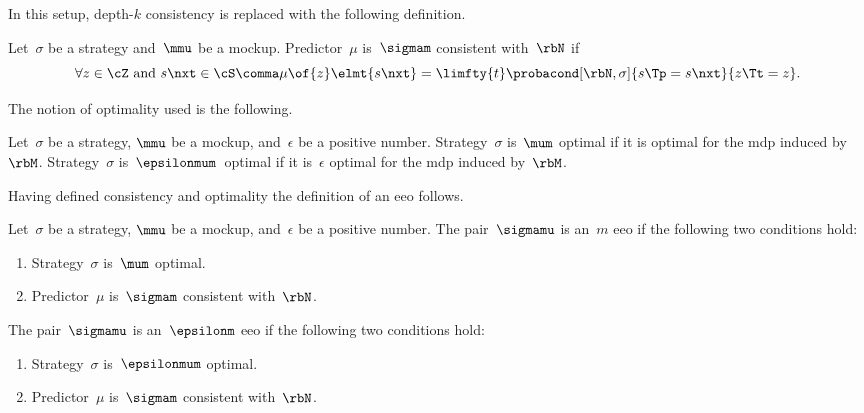 \begin{figure}[htp]
\centering
{}
\label{fig:agent_knowledge_single-agent_empirical_model_full}
\end{figure}

\begin{sidewaysfigure}
\centering
{}
\label{fig:agent_knowledge_single-agent_empirical_emphasized_full_mockup}
\end{sidewaysfigure}

In this setup, depth-\(k\) consistency is replaced with the following definition.
\begin{definition}
\label{def:consistency}
Let~\(\sigma\) be a strategy and~\(\mmu\) be a mockup.
Predictor~\(\mu\) is~\(\sigmam\) consistent with~\(\rbN\) if
\[
\forall z \in \cZ \text{ and } s\nxt \in \cS\comma \mu \of{z} \elmt{s\nxt} = \limfty{t}\probacond[\rbN, \sigma]{s\Tp = s\nxt}{z\Tt = z}.
\]
\end{definition}

The notion of optimality used is the following.
\begin{definition}
Let~\(\sigma\) be a strategy, \(\mmu\) be a mockup, and~\(\epsilon\) be a positive number.
Strategy~\(\sigma\) is~\(\mum\) optimal if it is optimal for the \ac{mdp} induced by~\(\rbM\).
Strategy~\(\sigma\) is~\(\epsilonmum\)~optimal if it is~\(\epsilon\) optimal for the \ac{mdp} induced by~\(\rbM\).
\end{definition}

Having defined consistency and optimality the definition of an \ac{eeo} follows.
\begin{definition}
Let~\(\sigma\) be a strategy, \(\mmu\) be a mockup, and~\(\epsilon\) be a positive number.
The pair~\(\sigmamu\) is an~\(m\) \ac{eeo} if the following two conditions hold:
\begin{enumerate}
\item Strategy~\(\sigma\) is~\(\mum\) optimal.
\item Predictor~\(\mu\) is~\(\sigmam\) consistent with~\(\rbN\).
\end{enumerate}
The pair~\(\sigmamu\) is an~\(\epsilonm\) \ac{eeo} if the following two conditions hold:
\begin{enumerate}
\item Strategy~\(\sigma\) is~\(\epsilonmum\) optimal.
\item Predictor~\(\mu\) is~\(\sigmam\) consistent with~\(\rbN\).
\end{enumerate}
\end{definition}

